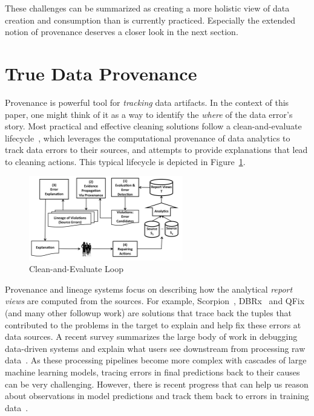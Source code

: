 \documentclass[11pt]{article}
\begin{document}
These challenges can be summarized as creating a more holistic view of data creation and consumption than is currently practiced. Especially the extended notion of provenance deserves a closer look in the next section.





%
\section{True Data Provenance}
\label{sec:provenance}

Provenance is powerful tool for {\em tracking} data artifacts. In the context of this paper, one might think of it as a way to identify the \emph{where} of the data error's story. Most practical and effective cleaning solutions follow a clean-and-evaluate lifecycle~\cite{Ilyas16DE}, which leverages the computational provenance of data analytics to track data errors to their sources, and attempts to provide explanations that lead to cleaning actions. This typical lifecycle is depicted in Figure~\ref{fig:lifecycle}. 
\begin{figure}[ht]
  \centering
  \includegraphics[width=0.6\textwidth]{letters/lifecycle}
  \caption{Clean-and-Evaluate Loop~\cite{Ilyas16DE}}
  \label{fig:lifecycle}
\end{figure}

Provenance and lineage systems focus on describing how the analytical {\em report views} are computed from the sources. For example, Scorpion~\cite{DBLP:journals/pvldb/0002M13}, DBRx~\cite{DBLP:conf/sigmod/ChalamallaIOP14} and QFix~\cite{DBLP:conf/sigmod/WangM017} (and many other followup work) are  solutions that trace back the tuples that contributed to the problems in the target to explain and help fix these errors at data sources. A recent survey summarizes the large body of work in debugging data-driven systems and explain what users see downstream from processing raw data~\cite{DBLP:journals/ftdb/GlavicMR21}. As these processing pipelines become more complex with cascades of large machine learning models, tracing errors in final predictions back to their causes can be very challenging. However, there is recent progress that can help us reason about observations in model predictions and track them back to errors in training data~\cite{DBLP:journals/corr/abs-2202-00622}.
\end{document}
